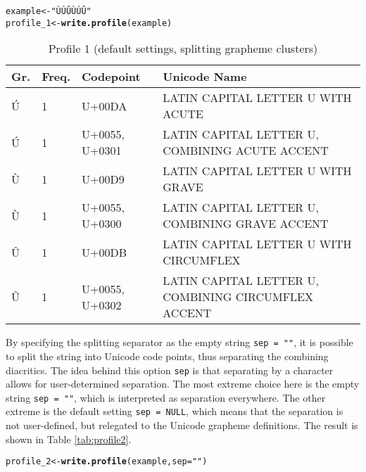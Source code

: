 \documentclass[output=book,nonflat,modfonts,
citecolor=brown,
		]{langsci/langscibook}\usepackage[]{graphicx}\usepackage[]{color}
\makeatletter
\newcommand{\hlstr}[1]{\textcolor[rgb]{0.192,0.494,0.8}{#1}}%
\newcommand{\hlstd}[1]{\textcolor[rgb]{0.345,0.345,0.345}{#1}}%
\newcommand{\hlkwb}[1]{\textcolor[rgb]{0.69,0.353,0.396}{#1}}%
\newcommand{\hlkwc}[1]{\textcolor[rgb]{0.333,0.667,0.333}{#1}}%
\newcommand{\hlkwd}[1]{\textcolor[rgb]{0.737,0.353,0.396}{\textbf{#1}}}%
\newenvironment{kframe}{%
 \def\at@end@of@kframe{}%
 \ifinner\ifhmode%
  \def\at@end@of@kframe{\end{minipage}}%
  \begin{minipage}{\columnwidth}%
 \fi\fi%
 \def\FrameCommand##1{\hskip\@totalleftmargin \hskip-\fboxsep
 \colorbox{shadecolor}{##1}\hskip-\fboxsep
     \hskip-\linewidth \hskip-\@totalleftmargin \hskip\columnwidth}%
 \MakeFramed {\advance\hsize-\width
   \@totalleftmargin\z@ \linewidth\hsize
   \@setminipage}}%
 {\par\unskip\endMakeFramed%
 \at@end@of@kframe}
\newenvironment{knitrout}{}{} %
\makeatother
\begin{document}
\begin{knitrout}\footnotesize
{}\color{fgcolor}\begin{kframe}
\begin{alltt}
\hlstd{example} \hlkwb{<-} \hlstr{"ÙÚÛÙÚÛ"}
\hlstd{profile_1} \hlkwb{<-} \hlkwd{write.profile}\hlstd{(example)}
\end{alltt}
\end{kframe}
\end{knitrout}

\begin{table}[H]
\centering
\begingroup\scriptsize
\begin{tabular}{llll}
  \toprule
Gr. & Freq. & Codepoint & Unicode Name \\ 
  \midrule
Ú & 1 & U+00DA & LATIN CAPITAL LETTER U WITH ACUTE \\ 
  Ú & 1 & U+0055, U+0301 & LATIN CAPITAL LETTER U, COMBINING ACUTE ACCENT \\ 
  Ù & 1 & U+00D9 & LATIN CAPITAL LETTER U WITH GRAVE \\ 
  Ù & 1 & U+0055, U+0300 & LATIN CAPITAL LETTER U, COMBINING GRAVE ACCENT \\ 
  Û & 1 & U+00DB & LATIN CAPITAL LETTER U WITH CIRCUMFLEX \\ 
  Û & 1 & U+0055, U+0302 & LATIN CAPITAL LETTER U, COMBINING CIRCUMFLEX ACCENT \\ 
   \bottomrule
\end{tabular}
\endgroup
\caption{Profile 1 (default settings, splitting grapheme clusters)} 
\label{tab:profile1}
\end{table}


By specifying the splitting separator as the empty string
\texttt{sep~=~""}, it is possible to split the string into Unicode code points,
thus separating the combining diacritics. The idea behind this option
\texttt{sep} is that separating by a character allows for user-determined
separation. The most extreme choice here is the empty string \texttt{sep~=~""},
which is interpreted as separation everywhere. The other extreme is the default
setting \texttt{sep~=~NULL}, which means that the separation is not
user-defined, but relegated to the Unicode grapheme definitions. The result is 
shown in Table \ref{tab:profile2}.

\begin{knitrout}\footnotesize
{}\color{fgcolor}\begin{kframe}
\begin{alltt}
\hlstd{profile_2} \hlkwb{<-} \hlkwd{write.profile}\hlstd{(example,} \hlkwc{sep} \hlstd{=} \hlstr{""}\hlstd{)}
\end{alltt}
\end{kframe}
\end{knitrout}
\end{document}
